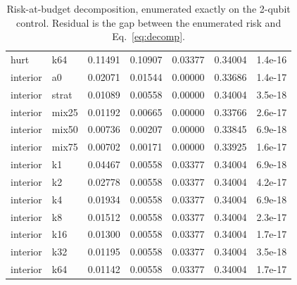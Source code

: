 \begin{table}[h]
\begin{tabular}{llrrrrr}
hurt & k64 & 0.11491 & 0.10907 & 0.03377 & 0.34004 & 1.4e-16 \\
interior & a0 & 0.02071 & 0.01544 & 0.00000 & 0.33686 & 1.4e-17 \\
interior & strat & 0.01089 & 0.00558 & 0.00000 & 0.34004 & 3.5e-18 \\
interior & mix25 & 0.01192 & 0.00665 & 0.00000 & 0.33766 & 2.6e-17 \\
interior & mix50 & 0.00736 & 0.00207 & 0.00000 & 0.33845 & 6.9e-18 \\
interior & mix75 & 0.00702 & 0.00171 & 0.00000 & 0.33925 & 1.6e-17 \\
interior & k1 & 0.04467 & 0.00558 & 0.03377 & 0.34004 & 6.9e-18 \\
interior & k2 & 0.02778 & 0.00558 & 0.03377 & 0.34004 & 4.2e-17 \\
interior & k4 & 0.01934 & 0.00558 & 0.03377 & 0.34004 & 6.9e-18 \\
interior & k8 & 0.01512 & 0.00558 & 0.03377 & 0.34004 & 2.3e-17 \\
interior & k16 & 0.01300 & 0.00558 & 0.03377 & 0.34004 & 1.7e-17 \\
interior & k32 & 0.01195 & 0.00558 & 0.03377 & 0.34004 & 3.5e-18 \\
interior & k64 & 0.01142 & 0.00558 & 0.03377 & 0.34004 & 1.7e-17 \\
\bottomrule\end{tabular}
\caption{Risk-at-budget decomposition, enumerated exactly on the 2-qubit control. Residual is the gap between the enumerated risk and Eq.~\eqref{eq:decomp}.}
\end{table}
